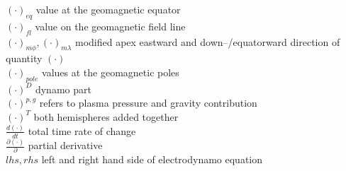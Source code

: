 \begin{tabbing}
\>$(\cdot)_{eq}$        \>  value at the geomagnetic equator   \\

\>$(\cdot)_{fl}$        \>  value on the geomagnetic  field line   \\

\>$(\cdot)_{m \phi} ,(\cdot)_{m \lambda}$         \>  modified apex eastward and down--/equatorward direction of quantity $(\cdot)$  \\

\>$(\cdot)_{pole}$      \>  values at the geomagnetic poles   \\

\>$(\cdot)^D$        	\>  dynamo part   \\

\>$(\cdot)^{p,g}$       \>  refers to plasma pressure and gravity contribution   \\

\>$(\cdot)^T$        	\>  both hemispheres added together   \\

\>$\frac{d (\cdot)}{dt}$\>  total time rate of change   \\

\>$\frac{\partial (\cdot)}{\partial}$\>  partial derivative   \\

\>$lhs, rhs$        		\>  left and right hand side of electrodynamo equation   \\


\end{tabbing}

